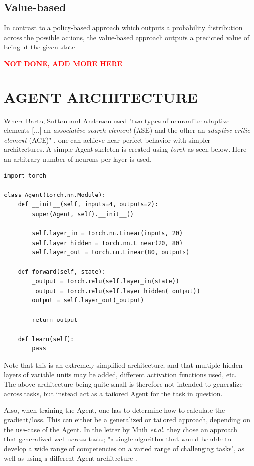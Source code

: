 \documentclass{article}
\renewenvironment{leftbar}[1][\hsize]{
    \def\FrameCommand{{\color{barcolor}\vrule width 0.5pt \hspace{10pt}}}
    \MakeFramed{\hsize#1 \advance\hsize-\width \FrameRestore}
}{\endMakeFramed}
\begin{document}
\subsection*{Value-based}
\begin{leftbar}
    In contrast to a policy-based approach which outputs a probability distribution across the possible actions, the value-based approach outputs a predicted value of being at the given state. \cite{HF-value}

    \textbf{\textcolor{red}{NOT DONE, ADD MORE HERE}}
\end{leftbar}

\section*{AGENT ARCHITECTURE}

Where Barto, Sutton and Anderson used "two types of neuronlike adaptive elements [...] an \textit{associative search element} (ASE) and the other an \textit{adaptive critic element} (ACE)" \cite{Neuronlike}, one can achieve near-perfect behavior with simpler architectures. A simple Agent skeleton is created using \textit{torch} as seen below. Here an arbitrary number of neurons per layer is used.

\begin{lstlisting}
import torch

class Agent(torch.nn.Module):
    def __init__(self, inputs=4, outputs=2):
        super(Agent, self).__init__()

        self.layer_in = torch.nn.Linear(inputs, 20)
        self.layer_hidden = torch.nn.Linear(20, 80)
        self.layer_out = torch.nn.Linear(80, outputs)

    def forward(self, state):
        _output = torch.relu(self.layer_in(state))
        _output = torch.relu(self.layer_hidden(_output))
        output = self.layer_out(_output)

        return output

    def learn(self):
        pass
\end{lstlisting}

Note that this is an extremely simplified architecture, and that multiple hidden layers of variable units may be added, different activation functions used, etc. The above architecture being quite small is therefore not intended to generalize across tasks, but instead act as a tailored Agent for the task in question.

Also, when training the Agent, one has to determine how to calculate the gradient/loss. This can either be a generalized or tailored approach, depending on the use-case of the Agent. In the letter by Mnih \textit{et.al.} they chose an approach that generalized well across tasks; "a single algorithm that would be able to develop a wide range of competencies on a varied range of challenging tasks", as well as using a different Agent architecture \cite{Human-level}.
\end{document}
